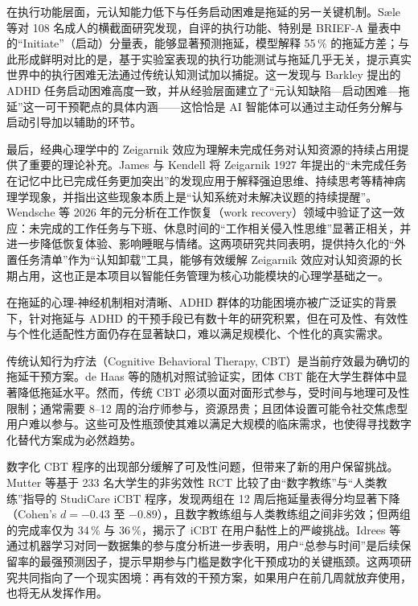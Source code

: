 \par 在执行功能层面，元认知能力低下与任务启动困难是拖延的另一关键机制。Sæle 等对 108 名成人的横截面研究发现，自评的执行功能、特别是 BRIEF-A 量表中的``Initiate''（启动）分量表，能够显著预测拖延，模型解释 55\,\% 的拖延方差；与此形成鲜明对比的是，基于实验室表现的执行功能测试与拖延几乎无关，提示真实世界中的执行困难无法通过传统认知测试加以捕捉\cite{saele2026lower}。这一发现与 Barkley 提出的 ADHD 任务启动困难高度一致，并从经验层面建立了``元认知缺陷—启动困难—拖延''这一可干预靶点的具体内涵——这恰恰是 AI 智能体可以通过主动任务分解与启动引导加以辅助的环节。

\par 最后，经典心理学中的 Zeigarnik 效应为理解未完成任务对认知资源的持续占用提供了重要的理论补充。James 与 Kendell 将 Zeigarnik 1927 年提出的``未完成任务在记忆中比已完成任务更加突出''的发现应用于解释强迫思维、持续思考等精神病理学现象，并指出这些现象本质上是``认知系统对未解决议题的持续提醒''\cite{james1997zeigarnik}。Wendsche 等 2026 年的元分析在工作恢复（work recovery）领域中验证了这一效应：未完成的工作任务与下班、休息时间的``工作相关侵入性思维''显著正相关，并进一步降低恢复体验、影响睡眠与情绪\cite{wendsche2026zeigarnik}。这两项研究共同表明，提供持久化的``外置任务清单''作为``认知卸载''工具，能够有效缓解 Zeigarnik 效应对认知资源的长期占用，这也正是本项目以智能任务管理为核心功能模块的心理学基础之一。

\par 在拖延的心理-神经机制相对清晰、ADHD 群体的功能困境亦被广泛证实的背景下，针对拖延与 ADHD 的干预手段已有数十年的研究积累，但在可及性、有效性与个性化适配性方面仍存在显著缺口，难以满足规模化、个性化的真实需求。

\par 传统认知行为疗法（Cognitive Behavioral Therapy, CBT）是当前疗效最为确切的拖延干预方案。de Haas 等的随机对照试验证实，团体 CBT 能在大学生群体中显著降低拖延水平\cite{dehaas2025group}。然而，传统 CBT 必须以面对面形式参与，受时间与地理可及性限制；通常需要 8--12 周的治疗师参与，资源昂贵；且团体设置可能令社交焦虑型用户难以参与。这些可及性瓶颈使其难以满足大规模的临床需求，也使得寻找数字化替代方案成为必然趋势。

\par 数字化 CBT 程序的出现部分缓解了可及性问题，但带来了新的用户保留挑战。Mutter 等基于 233 名大学生的非劣效性 RCT 比较了由``数字教练''与``人类教练''指导的 StudiCare iCBT 程序，发现两组在 12 周后拖延量表得分均显著下降（Cohen's $d=-0.43$ 至 $-0.89$），且数字教练组与人类教练组之间非劣效；但两组的完成率仅为 34\,\% 与 36\,\%，揭示了 iCBT 在用户黏性上的严峻挑战\cite{mutter2023studicare}。Idrees 等通过机器学习对同一数据集的参与度分析进一步表明，用户``总参与时间''是后续保留率的最强预测因子，提示早期参与门槛是数字化干预成功的关键瓶颈\cite{idrees2024engagement}。这两项研究共同指向了一个现实困境：再有效的干预方案，如果用户在前几周就放弃使用，也将无从发挥作用。

